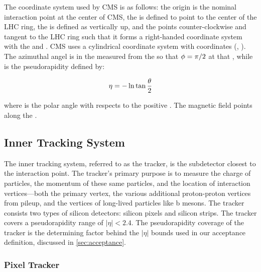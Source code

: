 The coordinate system used by CMS is as follows: the origin is the nominal
interaction point at the center of CMS, the \xaxis is defined to point to the
center of the LHC ring, the \yaxis is defined as vertically up, and the \zaxis
points counter-clockwise and tangent to the LHC ring such that it forms a
right-handed coordinate system with the \xaxis and \yaxis. CMS uses a
cylindrical coordinate system with coordinates (\coordeta, \coordphi). The
azimuthal angel \coordphi is in the \xyplane measured from the \xaxis so that
$\phi=\pi/2$ at that \yaxis, while \coordeta is the pseudorapidity defined
by:

\begin{equation}
    \eta = -\operatorname{ln} \tan \frac{\theta}{2}
\end{equation}

where \coordtheta is the polar angle with respects to the positive \zaxis. The
magnetic field points along the \zaxis.

\subsection{Inner Tracking System}

The inner tracking system, referred to as the tracker, is the subdetector
closest to the interaction point. The tracker's primary purpose is to measure
the charge of particles, the momentum of these same particles, and the location
of interaction vertices---both the primary vertex, the various additional
proton-proton vertices from pileup, and the vertices of long-lived particles
like b mesons. The tracker consists two types of silicon detectors: silicon
pixels and silicon strips. The tracker covers a pseudorapidity range of $|\eta|
< 2.4$. The pseudorapidity coverage of the tracker is the determining factor
behind the $|\eta|$ bounds used in our acceptance definition, discussed in
\cref{sec:acceptance}.

\subsubsection{Pixel Tracker}

